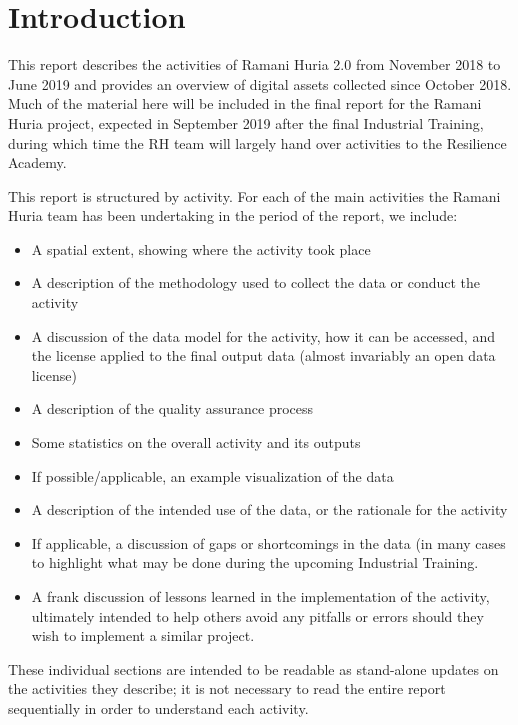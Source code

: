 \documentclass[a4paper,12pt,twoside]{article}
\begin{document}
\newpage
\section{Introduction}
\label{Introduction}

This report describes the activities of Ramani Huria 2.0 from November 2018 to June 2019 and provides an overview of digital assets collected since October 2018. Much of the material here will be included in the final report for the Ramani Huria project, expected in September 2019 after the final Industrial Training, during which time the RH team will largely hand over activities to the Resilience Academy.

This report is structured by activity. For each of the main activities the Ramani Huria team has been undertaking in the period of the report, we include:

\begin{itemize}
  \item A spatial extent, showing where the activity took place
  \item A description of the methodology used to collect the data or conduct the activity
  \item A discussion of the data model for the activity, how it can be accessed, and the license applied to the final output data (almost invariably an open data license)
  \item A description of the quality assurance process
  \item Some statistics on the overall activity and its outputs
  \item If possible/applicable, an example visualization of the data
  \item A description of the intended use of the data, or the rationale for the activity
  \item If applicable, a discussion of gaps or shortcomings in the data (in many cases to highlight what may be done during the upcoming Industrial Training.
  \item A frank discussion of lessons learned in the implementation of the activity, ultimately intended to help others avoid any pitfalls or errors should they wish to implement a similar project.
\end{itemize}

These individual sections are intended to be readable as stand-alone updates on the activities they describe; it is not necessary to read the entire report sequentially in order to understand each activity.
\end{document}
